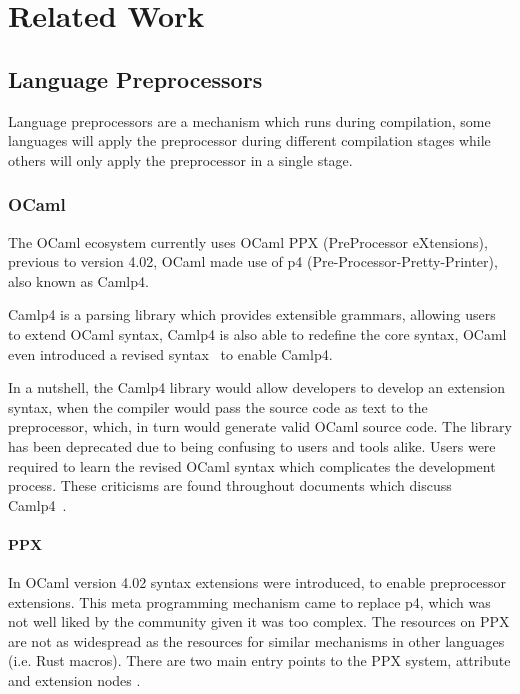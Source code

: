 \chapter{Related Work}\label{cha:related-work}

\section{Language Preprocessors}\label{sec:lang-preprocessors}
Language preprocessors are a mechanism which runs during compilation,
some languages will apply the preprocessor during different compilation stages while others will only apply the preprocessor in a single stage.


\subsection{OCaml}\label{sec:lang-preprocessors:ocaml}

The OCaml ecosystem currently uses OCaml PPX (PreProcessor eXtensions),
previous to version 4.02, OCaml made use of p4 (Pre-Processor-Pretty-Printer), also known as Camlp4.

Camlp4 is a parsing library which provides extensible grammars,
allowing users to extend OCaml syntax,
Camlp4 is also able to redefine the core syntax,
OCaml even introduced a revised syntax~\autocite{Rauglaudre2003} to enable Camlp4.

In a nutshell, the Camlp4 library would allow developers to develop an extension syntax,
when the compiler would pass the source code as text to the preprocessor,
which, in turn would generate valid OCaml source code.
The library has been deprecated due to being confusing to users and tools alike.
Users were required to learn the revised OCaml syntax which complicates the development process.
These criticisms are found throughout documents which discuss Camlp4~\autocite{Whitequark2014}.

\subsubsection*{PPX}\label{sec:lang-preprocessors:ocaml:ppx}

In OCaml version 4.02 syntax extensions were introduced, to enable preprocessor extensions.
This meta programming mechanism came to replace \gls{p4}, which was not well liked by the community given it was too complex.
The resources on \gls{PPX} are not as widespread as the resources for similar mechanisms in other languages (i.e. Rust macros).
There are two main entry points to the PPX system, attribute and extension nodes \autocite[Sections 8.12 \& 8.13]{Leroy2020}.

